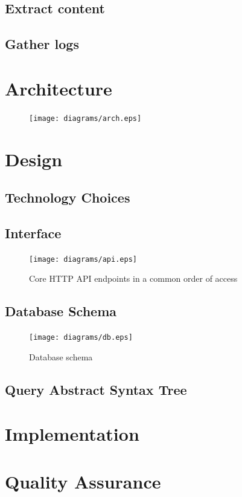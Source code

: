 \documentclass[a4paper,12pt]{book}
\begin{document}
\subsection{Extract content}
\subsection{Gather logs}

\section{Architecture}
\begin{figure}
  \texttt{[image: diagrams/arch.eps]}
\end{figure}

\section{Design}
\subsection{Technology Choices}

\subsection{Interface}
\begin{figure}
  \texttt{[image: diagrams/api.eps]}
  \caption{Core HTTP API endpoints in a common order of access}
  \label{db}
\end{figure}

\subsection{Database Schema}
\begin{figure}
  \texttt{[image: diagrams/db.eps]}
  \caption{Database schema}
  \label{db}
\end{figure}

\subsection{Query Abstract Syntax Tree}

\section{Implementation}

\section{Quality Assurance}
\end{document}
